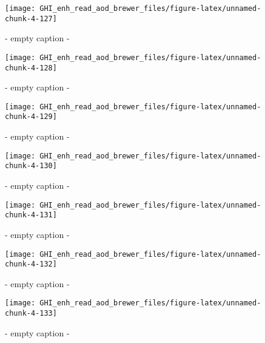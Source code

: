 \documentclass[
  10pt,
  a4paper,oneside]{article}
\begin{document}
\begin{figure}[H]

{\centering \texttt{[image: GHI\_enh\_read\_aod\_brewer\_files/figure-latex/unnamed-chunk-4-127]} 

}

\caption{ - empty caption - }\label{fig:unnamed-chunk-4-127}
\end{figure}
\begin{figure}[H]

{\centering \texttt{[image: GHI\_enh\_read\_aod\_brewer\_files/figure-latex/unnamed-chunk-4-128]} 

}

\caption{ - empty caption - }\label{fig:unnamed-chunk-4-128}
\end{figure}
\begin{figure}[H]

{\centering \texttt{[image: GHI\_enh\_read\_aod\_brewer\_files/figure-latex/unnamed-chunk-4-129]} 

}

\caption{ - empty caption - }\label{fig:unnamed-chunk-4-129}
\end{figure}
\begin{figure}[H]

{\centering \texttt{[image: GHI\_enh\_read\_aod\_brewer\_files/figure-latex/unnamed-chunk-4-130]} 

}

\caption{ - empty caption - }\label{fig:unnamed-chunk-4-130}
\end{figure}
\begin{figure}[H]

{\centering \texttt{[image: GHI\_enh\_read\_aod\_brewer\_files/figure-latex/unnamed-chunk-4-131]} 

}

\caption{ - empty caption - }\label{fig:unnamed-chunk-4-131}
\end{figure}
\begin{figure}[H]

{\centering \texttt{[image: GHI\_enh\_read\_aod\_brewer\_files/figure-latex/unnamed-chunk-4-132]} 

}

\caption{ - empty caption - }\label{fig:unnamed-chunk-4-132}
\end{figure}
\begin{figure}[H]

{\centering \texttt{[image: GHI\_enh\_read\_aod\_brewer\_files/figure-latex/unnamed-chunk-4-133]} 

}

\caption{ - empty caption - }\label{fig:unnamed-chunk-4-133}
\end{figure}
\end{document}
